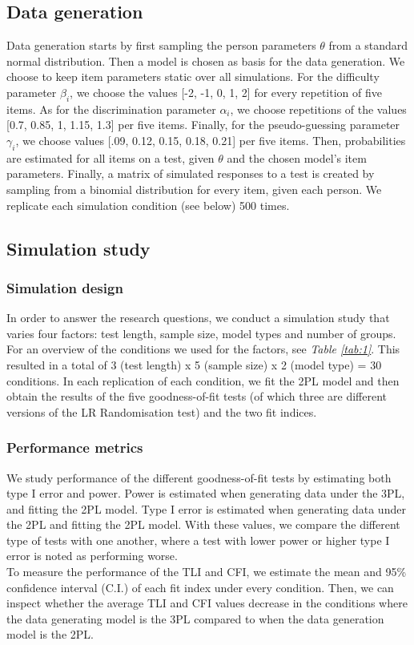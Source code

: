 \documentclass[Royal,sageapa,times,doublespace]{sagej}
\begin{document}
\subsection{Data generation}
Data generation starts by first sampling the person parameters $\theta$ from a standard normal distribution. Then a model is chosen as basis for the data generation. We choose to keep item parameters static over all simulations. For the difficulty parameter $\beta_i$, we choose the values [-2, -1, 0, 1, 2] for every repetition of five items. As for the discrimination parameter $\alpha_i$, we choose repetitions of the values [0.7, 0.85, 1, 1.15, 1.3] per five items. Finally, for the pseudo-guessing parameter $\gamma_i$, we choose values [.09, 0.12, 0.15, 0.18, 0.21] per five items. Then, probabilities are estimated for all items on a test, given $\theta$ and the chosen model's item parameters. Finally, a matrix of simulated responses to a test is created by sampling from a binomial distribution for every item, given each person. We replicate each simulation condition (see below) 500 times.

\subsection{Simulation study}
\subsubsection{Simulation design}
In order to answer the research questions, we conduct a simulation study that varies four factors: test length, sample size, model types and number of groups. For an overview of the conditions we used for the factors, see \textit{Table \ref{tab:1}}. This resulted in a total of 3 (test length) x 5 (sample size) x 2 (model type) = 30 conditions. In each replication of each condition, we fit the 2PL model and then obtain the results of the five goodness-of-fit tests (of which three are different versions of the LR Randomisation test) and the two fit indices. 
\subsubsection{Performance metrics}
We study performance of the different goodness-of-fit tests by estimating both type I error and power. Power is estimated when generating data under the 3PL, and fitting the 2PL model. Type I error is estimated when generating data under the 2PL and fitting the 2PL model. With these values, we compare the different type of tests with one another, where a test with lower power or higher type I error is noted as performing worse. \\
\indent To measure the performance of the TLI and CFI, we estimate the mean and 95\% confidence interval (C.I.) of each fit index under every condition. Then, we can inspect whether the average TLI and CFI values decrease in the conditions where the data generating model is the 3PL compared to when the data generation model is the 2PL. 
\end{document}
